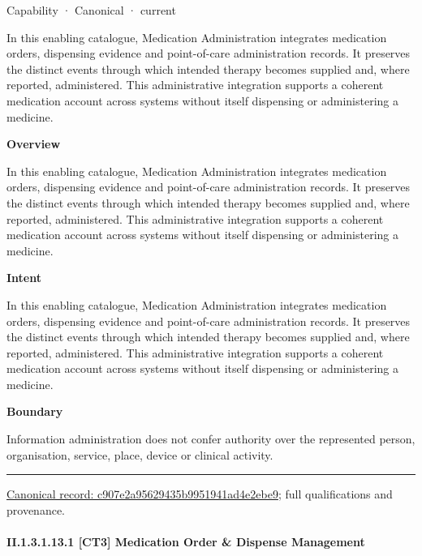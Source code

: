 \label{element:c907e2a95629435b9951941ad4e2ebe9}
{\small Capability · Canonical · current}\par

In this enabling catalogue, Medication Administration integrates medication orders, dispensing evidence and point-of-care administration records. It preserves the distinct events through which intended therapy becomes supplied and, where reported, administered. This administrative integration supports a coherent medication account across systems without itself dispensing or administering a medicine.



\textbf{Overview}



In this enabling catalogue, Medication Administration integrates medication orders, dispensing evidence and point-of-care administration records. It preserves the distinct events through which intended therapy becomes supplied and, where reported, administered. This administrative integration supports a coherent medication account across systems without itself dispensing or administering a medicine.



\textbf{Intent}



In this enabling catalogue, Medication Administration integrates medication orders, dispensing evidence and point-of-care administration records. It preserves the distinct events through which intended therapy becomes supplied and, where reported, administered. This administrative integration supports a coherent medication account across systems without itself dispensing or administering a medicine.



\textbf{Boundary}



Information administration does not confer authority over the represented person, organisation, service, place, device or clinical activity.



\medskip\hrule\medskip

{\footnotesize \href{../../../../continuum/strategy/capability/c907e2a95629435b9951941ad4e2ebe9.md}{Canonical record: c907e2a95629435b9951941ad4e2ebe9}; full qualifications and provenance.}\par
\paragraph*{II.1.3.1.13.1 [CT3] Medication Order \& Dispense Management}
\label{navigation:II.1.3.1.13.1}

